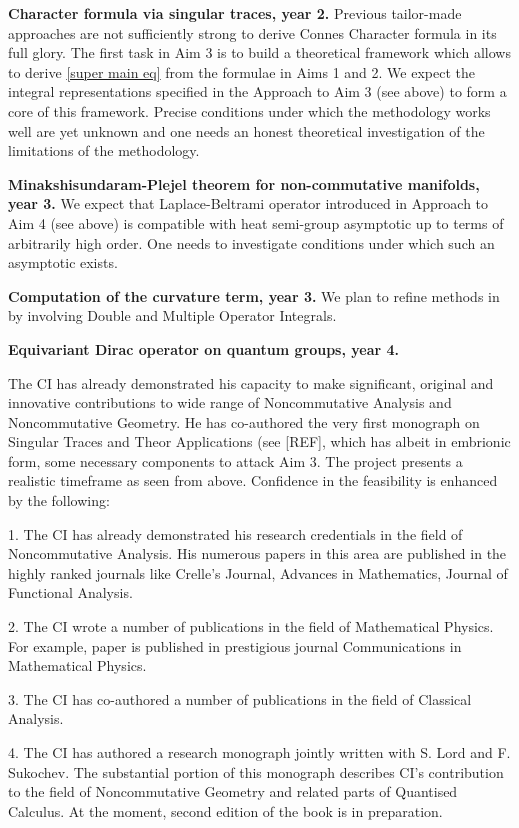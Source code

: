 \documentclass{article}
\newcommand{\archeading}[1]{\vspace{.3cm} \noindent{\bfseries #1} \vspace{.1cm}   }
\begin{document}
{\bf Character formula via singular traces, year 2.} Previous tailor-made approaches \cite{CGRS} are not sufficiently strong to derive Connes Character formula in its full glory. The first task in Aim 3 is to build a theoretical framework which allows to derive \eqref{super main eq} from the formulae in Aims 1 and 2. We expect the integral representations specified in the Approach to Aim 3 (see above) to form a core of this framework. Precise conditions under which the methodology works well are yet unknown and one needs an honest theoretical investigation of the limitations of the methodology.


{\bf Minakshisundaram-Plejel theorem for non-commutative manifolds, year 3.} We expect that Laplace-Beltrami operator introduced in Approach to Aim 4 (see above) is compatible with heat semi-group asymptotic up to terms of arbitrarily high order. One needs to investigate conditions under which such an asymptotic exists. 

{\bf Computation of the curvature term, year 3.} We plan to refine methods in \cite{Lesch}  by involving Double and Multiple Operator Integrals. 

{\bf Equivariant Dirac operator on quantum groups, year 4.}


\bigskip\archeading{Feasibility and Strategic Alignment}
The CI has already demonstrated his capacity to make significant, original and innovative contributions to wide range of Noncommutative Analysis {\color{red} and Noncommutative Geometry. He has co-authored the very first monograph on Singular Traces and Theor Applications (see [REF], which has albeit in embrionic form, some necessary components to attack Aim 3}. The project presents a realistic timeframe as seen from above. Confidence in the feasibility is enhanced by the following:

1. The CI has already demonstrated his research credentials in the field of Noncommutative Analysis. His numerous papers in this area are published in the highly ranked journals like Crelle's Journal, Advances in Mathematics, Journal of Functional Analysis.

2. The CI wrote a number of publications in the field of Mathematical Physics. For example, paper \cite{SZ-cmp} is published in prestigious journal Communications in Mathematical Physics.

3. The CI has co-authored a number of publications in the field of Classical Analysis.

4. The CI has authored a research monograph \cite{book} jointly written with S. Lord and F. Sukochev. The substantial portion of this monograph describes CI's contribution to the field {\color{red} of Noncommutative Geometry and related parts of Quantised Calculus}. At the moment, second edition of the book is in preparation.
\end{document}
